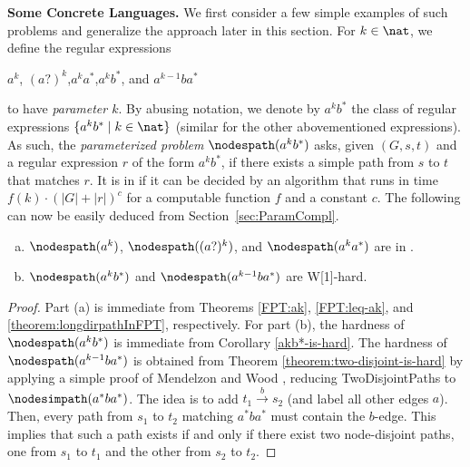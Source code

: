 \documentclass[a4paper,english]{lipics-v2016}
\theoremstyle{plain}
\begin{document}
\medskip \noindent \textbf{Some Concrete Languages.}
We
first consider a few simple examples of such problems and generalize
the approach later in this section. For $k\in\nat$, we define the regular expressions

\centerline{$a^k$, \qquad $(a?)^k$,\qquad $a^k a^*$,\qquad $a^k b^*$, \qquad and $a^{k-1} b a^*$}

\noindent to have \emph{parameter $k$}. By abusing notation, we denote by $a^k
b^*$ the class of regular expressions $\{a^k b^* \mid k \in \nat\}$
(similar for the other abovementioned expressions).  As such, the
\emph{parameterized problem} $\nodespath(a^k b^*)$ asks, given $(G,s,t)$
and a regular expression $r$ of the form $a^k b^*$, if there exists a
simple path from $s$ to $t$ that matches $r$. It is in \fpt if it can
be decided by an algorithm that runs in time $f(k) \cdot (|G|+|r|)^c$
for a computable function $f$ and a constant $c$.  The following can
now be easily deduced from Section~\ref{sec:ParamCompl}.
\begin{theorem} \label{theo:languageoverview}
\begin{enumerate}[(a)]
\item $\nodespath(a^k)$, $\nodespath((a?)^k)$, and $\nodespath(a^ka^*)$ are in \fpt.  \label{theo:languageoverview:a}
\item $\nodespath(a^kb^*)$ and $\nodespath(a^{k-1}b a^*)$ 
  are   W[1]-hard. \label{theo:languageoverview:b}
\end{enumerate}
\end{theorem}
\begin{proof}
  Part (a) is immediate from Theorems \ref{FPT:ak}, \ref{FPT:leq-ak},
  and \ref{theorem:longdirpathInFPT}, respectively.  For part (b), the
  hardness of $\nodespath(a^kb^*)$ is immediate from Corollary
  \ref{akb*-is-hard}. The hardness of $\nodespath(a^{k-1}b a^*)$ is
  obtained from Theorem \ref{theorem:two-disjoint-is-hard} by applying
  a simple proof of Mendelzon and Wood \cite[Theorem 1
  (2)]{mendelzon}, reducing \textsf{TwoDisjointPaths} to
  $\nodesimpath(a^*ba^*)$. 
  The idea is to add $t_1 \stackrel{b}{\to} s_2$ (and label all other edges $a$). 
  Then, every path from $s_1$ to $t_2$ matching $a^*ba^*$ must contain the $b$-edge. This implies that such 
  a path exists if and only if there exist two node-disjoint paths, one from
    $s_1$ to $t_1$ and the other from $s_2$ to $t_2$.
\end{proof}
\end{document}
